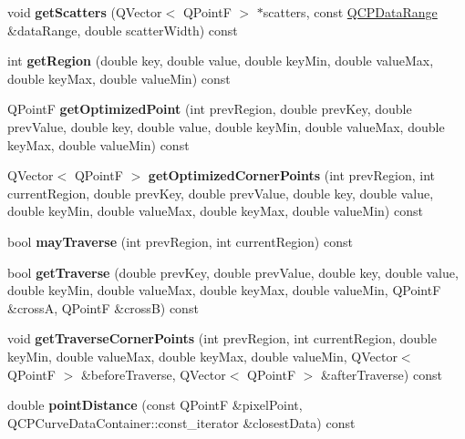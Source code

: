 \begin{DoxyCompactItemize}
\item 
void {\bfseries get\+Scatters} (Q\+Vector$<$ Q\+PointF $>$ $\ast$scatters, const \hyperlink{classQCPDataRange}{Q\+C\+P\+Data\+Range} \&data\+Range, double scatter\+Width) const \hypertarget{classQCPCurve_aaa0cc6dc484d2fc98ebaee4b121206fa}{}\label{classQCPCurve_aaa0cc6dc484d2fc98ebaee4b121206fa}

\item 
int {\bfseries get\+Region} (double key, double value, double key\+Min, double value\+Max, double key\+Max, double value\+Min) const \hypertarget{classQCPCurve_a8e0df32978cc526d2f3f0e342834bd4c}{}\label{classQCPCurve_a8e0df32978cc526d2f3f0e342834bd4c}

\item 
Q\+PointF {\bfseries get\+Optimized\+Point} (int prev\+Region, double prev\+Key, double prev\+Value, double key, double value, double key\+Min, double value\+Max, double key\+Max, double value\+Min) const \hypertarget{classQCPCurve_a4ed1566795ea51d519f9f0d17f0f131d}{}\label{classQCPCurve_a4ed1566795ea51d519f9f0d17f0f131d}

\item 
Q\+Vector$<$ Q\+PointF $>$ {\bfseries get\+Optimized\+Corner\+Points} (int prev\+Region, int current\+Region, double prev\+Key, double prev\+Value, double key, double value, double key\+Min, double value\+Max, double key\+Max, double value\+Min) const \hypertarget{classQCPCurve_a929433e67ae3e3770236abea5f1e7a6d}{}\label{classQCPCurve_a929433e67ae3e3770236abea5f1e7a6d}

\item 
bool {\bfseries may\+Traverse} (int prev\+Region, int current\+Region) const \hypertarget{classQCPCurve_ae5b232c8201441a940516c745309a685}{}\label{classQCPCurve_ae5b232c8201441a940516c745309a685}

\item 
bool {\bfseries get\+Traverse} (double prev\+Key, double prev\+Value, double key, double value, double key\+Min, double value\+Max, double key\+Max, double value\+Min, Q\+PointF \&crossA, Q\+PointF \&crossB) const \hypertarget{classQCPCurve_aa5ba854363f7343c829e37c7d19830cd}{}\label{classQCPCurve_aa5ba854363f7343c829e37c7d19830cd}

\item 
void {\bfseries get\+Traverse\+Corner\+Points} (int prev\+Region, int current\+Region, double key\+Min, double value\+Max, double key\+Max, double value\+Min, Q\+Vector$<$ Q\+PointF $>$ \&before\+Traverse, Q\+Vector$<$ Q\+PointF $>$ \&after\+Traverse) const \hypertarget{classQCPCurve_ab231faca0b8d53c19be37c1baea14dd8}{}\label{classQCPCurve_ab231faca0b8d53c19be37c1baea14dd8}

\item 
double {\bfseries point\+Distance} (const Q\+PointF \&pixel\+Point, Q\+C\+P\+Curve\+Data\+Container\+::const\+\_\+iterator \&closest\+Data) const \hypertarget{classQCPCurve_ad95dda62d82d34271cdd22708a278d97}{}\label{classQCPCurve_ad95dda62d82d34271cdd22708a278d97}

\end{DoxyCompactItemize}
